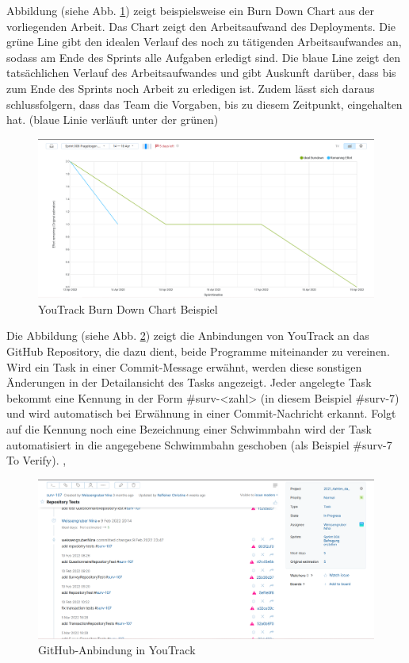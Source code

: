Abbildung (siehe Abb. \ref{fig:burndownchart}) zeigt beispielsweise ein Burn Down Chart aus der vorliegenden Arbeit.
Das Chart zeigt den Arbeitsaufwand des Deployments.  
Die grüne Line gibt den idealen Verlauf des noch zu tätigenden Arbeitsaufwandes an, sodass am Ende des Sprints alle Aufgaben erledigt sind.
Die blaue Line zeigt den tatsächlichen Verlauf des Arbeitsaufwandes und gibt Auskunft darüber, dass bis zum Ende des Sprints noch 
Arbeit zu erledigen ist. Zudem lässt sich daraus schlussfolgern, dass das Team die Vorgaben, bis zu diesem Zeitpunkt, 
eingehalten hat. (blaue Linie verläuft unter der grünen)
\begin{figure}[H]
    \includegraphics[width=1.0\textwidth]{pics/YouTrackBurnDownChart.PNG}
    \centering
    \caption{YouTrack Burn Down Chart Beispiel}
    \label{fig:burndownchart}
\end{figure}

Die Abbildung (siehe Abb. \ref{fig:youtrackGit}) zeigt die Anbindungen von YouTrack an das GitHub Repository, 
die dazu dient, beide Programme miteinander zu vereinen.
Wird ein Task in einer Commit-Message erwähnt, werden diese sonstigen Änderungen in der Detailansicht 
des Tasks angezeigt. Jeder angelegte Task bekommt eine Kennung in der Form \#surv-<zahl> (in diesem Beispiel
\#surv-7) und wird automatisch bei Erwähnung in einer Commit-Nachricht erkannt. Folgt auf die Kennung noch eine 
Bezeichnung einer Schwimmbahn wird der Task automatisiert in die angegebene 
Schwimmbahn geschoben (als Beispiel \#surv-7 To Verify). \cite{noauthor_youtrack_nodate}, \cite{noauthor_agile_nodate}
\begin{figure}[H]
    \includegraphics[width=1.0\textwidth]{pics/YoutrackGitCon.PNG}
    \centering
    \caption{GitHub-Anbindung in YouTrack}
    \label{fig:youtrackGit}
\end{figure}